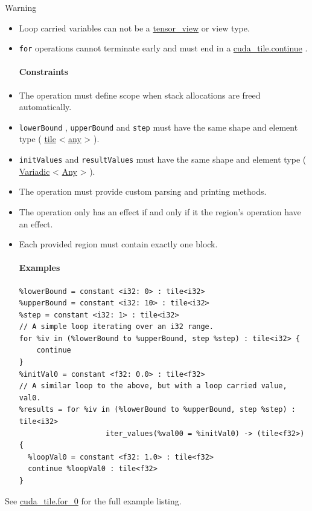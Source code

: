 \documentclass{article}
\begin{document}
Warning


\begin{itemize}
\item Loop carried variables can not be a \href{https://docs.nvidia.com/cuda/tile-ir/latest/sections/types.html#type-tensor-view}{tensor\_view} or view type.
\item \texttt{for} operations cannot terminate early and must end in a \href{https://docs.nvidia.com/cuda/tile-ir/latest/sections/operations.html#op-cuda-tile-continue}{cuda\_tile.continue} .


\paragraph{Constraints}

\item The operation must define scope when stack allocations are freed automatically.
\item \texttt{lowerBound} , \texttt{upperBound} and \texttt{step} must have the same shape and element type ( \href{https://docs.nvidia.com/cuda/tile-ir/latest/sections/types.html#type-tile}{tile} < \href{https://docs.nvidia.com/cuda/tile-ir/latest/sections/operations.html#type-any}{any} > ).
\item \texttt{initValues} and \texttt{resultValues} must have the same shape and element type ( \href{https://docs.nvidia.com/cuda/tile-ir/latest/sections/operations.html#type-variadic}{Variadic} < \href{https://docs.nvidia.com/cuda/tile-ir/latest/sections/operations.html#type-any}{Any} > ).
\item The operation must provide custom parsing and printing methods.
\item The operation only has an effect if and only if it the region's operation have an effect.
\item Each provided region must contain exactly one block.


\paragraph{Examples}

\begin{lstlisting}
%lowerBound = constant <i32: 0> : tile<i32>
%upperBound = constant <i32: 10> : tile<i32>
%step = constant <i32: 1> : tile<i32>
// A simple loop iterating over an i32 range.
for %iv in (%lowerBound to %upperBound, step %step) : tile<i32> {
    continue
}
%initVal0 = constant <f32: 0.0> : tile<f32>
// A similar loop to the above, but with a loop carried value, val0.
%results = for %iv in (%lowerBound to %upperBound, step %step) : tile<i32>
                    iter_values(%val00 = %initVal0) -> (tile<f32>) {
  %loopVal0 = constant <f32: 1.0> : tile<f32>
  continue %loopVal0 : tile<f32>
}
\end{lstlisting}

\end{itemize}
See \href{https://docs.nvidia.com/cuda/tile-ir/latest/sections/appendix.html#example-cuda-tile-for-0}{cuda\_tile.for\_0} for the full example listing.
\end{document}
